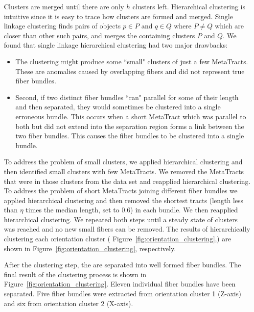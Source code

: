 Clusters are merged until there are only $h$ clusters left.
Hierarchical clustering is intuitive since it is easy to trace how clusters are formed and merged.
Single linkage clustering finds pairs of objects $p \in P$ and $q \in Q$ where $P \neq Q$ which are closer than other such pairs, and merges the containing clusters $P$ and $Q$.
We found that single linkage hierarchical clustering had two major drawbacks:
\begin{itemize}[nolistsep]
	\item The clustering might produce some ``small" clusters of just a few MetaTracts.
	These \mt are anomalies caused by overlapping fibers and did not represent true fiber bundles.
	\item Second, if two distinct fiber bundles ``ran" parallel for some of their length and then separated, they would sometimes be clustered into a single erroneous bundle.
	This occurs when a short MetaTract which was parallel to both but did not extend into the separation region forms a link between the two fiber bundles. This causes the fiber bundles to be clustered into a single bundle.
\end{itemize}

To address the problem of small clusters, we applied hierarchical clustering and then identified small clusters with few MetaTracts.
We removed the MetaTracts that were in those clusters from the data set and reapplied hierarchical clustering.
To address the problem of short MetaTracts joining different fiber bundles we applied hierarchical clustering and then removed the
shortest tracts (length less than $\eta$ times the median length, set to 0.6) in each bundle. We then reapplied hierarchical clustering.
We repeated both steps until a steady state of clusters was reached and no new small fibers can be removed. The results of hierarchically clustering each orientation cluster ( Figure~\ref{fig:orientation_clustering},) are shown in Figure~\ref{fig:orientation_clustering}, respectively.
 
 
After the clustering step, the \mt are separated into well formed fiber bundles. The final result of the clustering process is shown in Figure~\ref{fig:orientation_clustering}. Eleven individual fiber bundles have been separated. Five fiber bundles were extracted from orientation cluster 1 (Z-axis) and six from orientation cluster 2 (X-axis).  
